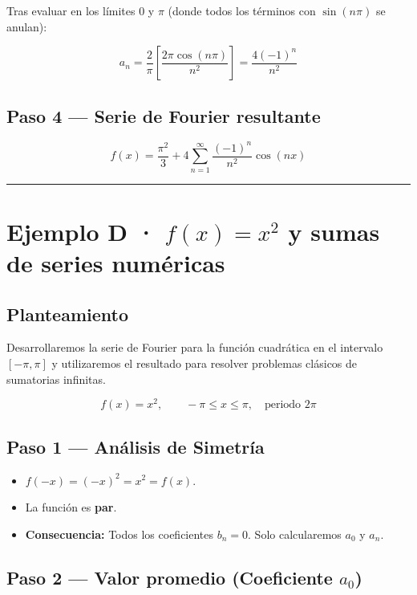 \documentclass[
  letterpaper,
  DIV=11,
  numbers=noendperiod]{scrreprt}
\providecommand{\tightlist}{%
  \setlength{\itemsep}{0pt}\setlength{\parskip}{0pt}}
\begin{document}
Tras evaluar en los límites \(0\) y \(\pi\) (donde todos los términos
con \(\sin(n\pi)\) se anulan):

\[
a_n = \frac{2}{\pi} \left[ \frac{2\pi\cos(n\pi)}{n^2} \right] = \frac{4(-1)^n}{n^2}
\]

\subsection{Paso 4 --- Serie de Fourier
resultante}\label{paso-4-serie-de-fourier-resultante-1}

\[
\boxed{f(x) = \frac{\pi^2}{3} + 4\sum_{n=1}^{\infty}\frac{(-1)^n}{n^2}\cos(nx)}
\]

\begin{center}\rule{0.5\linewidth}{0.5pt}\end{center}

\section{\texorpdfstring{Ejemplo D · \(f(x) = x^2\) y sumas de series
numéricas}{Ejemplo D · f(x) = x\^{}2 y sumas de series numéricas}}\label{sec-ej-d}

\subsection{Planteamiento}\label{planteamiento-8}

Desarrollaremos la serie de Fourier para la función cuadrática en el
intervalo \([-\pi, \pi]\) y utilizaremos el resultado para resolver
problemas clásicos de sumatorias infinitas.

\[
f(x) = x^2, \qquad -\pi \le x \le \pi, \quad \text{periodo } 2\pi
\]

\subsection{Paso 1 --- Análisis de
Simetría}\label{paso-1-anuxe1lisis-de-simetruxeda-4}

\begin{itemize}
\tightlist
\item
  \(f(-x) = (-x)^2 = x^2 = f(x)\).
\item
  La función es \textbf{par}.
\item
  \textbf{Consecuencia:} Todos los coeficientes \(b_n = 0\). Solo
  calcularemos \(a_0\) y \(a_n\).
\end{itemize}

\subsection{\texorpdfstring{Paso 2 --- Valor promedio (Coeficiente
\(a_0\))}{Paso 2 --- Valor promedio (Coeficiente a\_0)}}\label{paso-2-valor-promedio-coeficiente-a_0-3}
\end{document}
